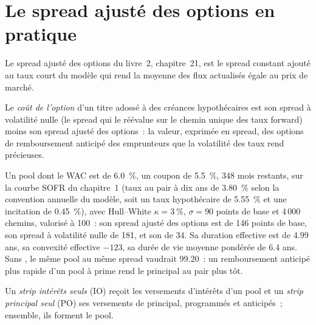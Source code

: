 \label{lst:rc:mortgage-modelling:flows}

\section{Le spread ajusté des options en pratique}

Le spread ajusté des options du livre~2, chapitre~21, est le spread constant
ajouté au taux court du modèle qui rend la moyenne des flux actualisés égale
au prix de marché.

\begin{definition}\label{def:rc:mortgage-modelling:optioncost}
Le \emph{coût de l'option} d'un titre adossé à des créances hypothécaires est son spread
à volatilité nulle (le spread qui le réévalue sur le chemin unique des taux forward) moins son spread ajusté des options~:
la valeur, exprimée en spread, des options de remboursement anticipé des emprunteurs
que la volatilité des taux rend précieuses.
\end{definition}

\begin{example}\label{ex:rc:mortgage-modelling:oas}
Un pool dont le WAC est de 6.0~\%, un coupon de 5.5~\%, 348 mois restants, sur la courbe SOFR du chapitre~1
(taux au pair à dix ans de 3.80~\% selon la convention annuelle du modèle, soit un taux hypothécaire de 5.55~\% et une incitation de 0.45~\%), avec
Hull--White $\kappa = 3~\%$, $\sigma = 90$ points de base et 4\,000 chemins, valorisé à 100~: son spread ajusté des options
est de 146 points de base, son spread à volatilité nulle de 181, et son
 de 34. Sa duration effective est de 4.99 ans, sa convexité effective $-123$, sa
durée de vie moyenne pondérée de 6.4 ans. Sans , le même pool au même spread vaudrait 99.20~:
un remboursement anticipé plus rapide d'un pool à prime rend le principal au pair plus tôt.
\end{example}

\begin{definition}\label{def:rc:mortgage-modelling:iopo}
Un \emph{strip intérêts seuls} (IO) reçoit les versements d'intérêts d'un pool
et un \emph{strip principal seul} (PO) ses versements de principal,
programmés et anticipés~; ensemble, ils forment le pool.
\end{definition}

